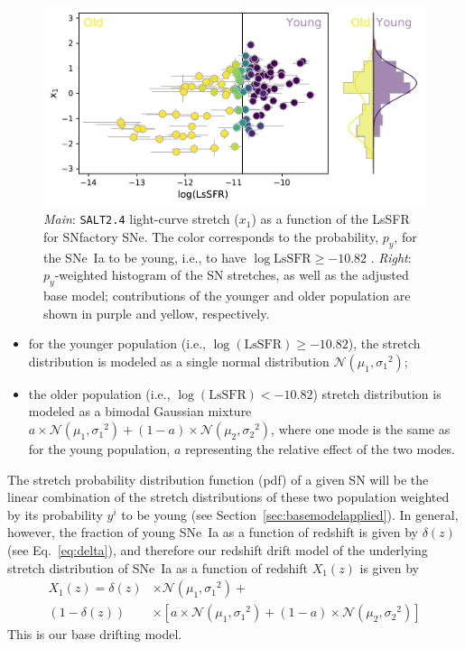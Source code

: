 \documentclass[]{aa}
\begin{document}
\begin{figure}
    \centering
    \includegraphics[width=0.8\linewidth]{Article_figures/model_base_hist.pdf}
    \caption{\textit{Main}: \textsc{\texttt{SALT2.4}} light-curve stretch ($x_1$)
        as a function of the LsSFR for
        SNfactory SNe. The color corresponds to the
        probability, $p_y$, for the SNe~Ia to be young, i.e., to have
        $\log\mathrm{LsSFR} \geq -10.82$ \citep[see][]{rigault2020}.
        \textit{Right}: $p_y$-weighted histogram of the SN stretches, as well as
        the adjusted base model; contributions of the younger and older population
        are shown in purple and yellow, respectively.}
    \label{fig:stretchlssfr}
\end{figure}

\begin{itemize}
    \item for the younger population (i.e., $\log(\mathrm{LsSFR})\geq-10.82$),
        the stretch distribution is modeled as a single normal distribution
        $\mathcal{N}(\mu_1, \sigma_1{}^2)$; 
    \item the older population (i.e., $\log( \mathrm{LsSFR})<-10.82$) stretch
        distribution is modeled as a bimodal Gaussian mixture $a\times
        \mathcal{N}(\mu_1, \sigma_1{}^2) + (1-a)\times \mathcal{N}(\mu_2,
        \sigma_2{}^2)$, where one mode is the same as for the young population,
        $a$ representing the relative effect of the two modes.
\end{itemize}

The stretch probability distribution function (pdf) of a given SN will be the
linear combination of the stretch distributions of these two population weighted
by its probability $y^i$ to be young (see Section~\ref{sec:basemodelapplied}).
In general, however, the fraction of young SNe~Ia as a function of redshift is given
by $\delta(z)$ (see Eq.~\ref{eq:delta}), and therefore our redshift drift model
of the underlying stretch distribution of SNe~Ia as a function of redshift
$X_1(z)$ is given by
\begin{align}\label{eq:stretchz}
    X_1(z) = \delta(z)&\times \mathcal{N}(\mu_1,\sigma_1{}^2) + \nonumber \\
    (1-\delta(z))&\times \left[ a\times\mathcal{N}(\mu_1,\sigma_1{}^2) +
    (1-a)\times\mathcal{N}(\mu_2,\sigma_2{}^2) \right]
\end{align}
This is our base drifting model.
\end{document}
